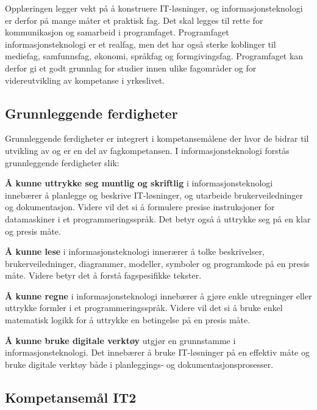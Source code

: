 \documentclass[%
oneside,                 %
final,                   %
10pt]{article}
\newenvironment{block_mdfboxadmon}[1][]{
\begin{block_mdfboxmdframed}[frametitle=#1]
}
{
\end{block_mdfboxmdframed}
}
\begin{document}
Opplæringen legger vekt på å konstruere IT-løsninger, og
informasjonsteknologi er derfor på mange måter et praktisk fag. Det
skal legges til rette for kommunikasjon og samarbeid i
programfaget. Programfaget informasjonsteknologi er et realfag, men
det har også sterke koblinger til mediefag, samfunnsfag, økonomi,
språkfag og formgivingsfag. Programfaget kan derfor gi et godt
grunnlag for studier innen ulike fagområder og for videreutvikling av
kompetanse i yrkeslivet.

\subsection{Grunnleggende ferdigheter}

Grunnleggende ferdigheter er integrert i kompetansemålene der hvor de
bidrar til utvikling av og er en del av fagkompetansen. I
informasjonsteknologi forstås grunnleggende ferdigheter slik:


\begin{block_mdfboxadmon}[]

\textbf{Å kunne uttrykke seg muntlig og skriftlig} i informasjonsteknologi
innebærer å planlegge og beskrive IT-løsninger, og utarbeide
brukerveiledninger og dokumentasjon. Videre vil det si å formulere
presise instruksjoner for datamaskiner i et programmeringsspråk. Det
betyr også å uttrykke seg på en klar og presis måte.

\textbf{Å kunne lese} i informasjonsteknologi innerærer å tolke beskrivelser,
brukerveiledninger, diagrammer, modeller, symboler og programkode på
en presis måte. Videre betyr det å forstå fagspesifikke tekster.

\textbf{Å kunne regne} i informasjonsteknologi innebærer å gjøre enkle
utregninger eller uttrykke formler i et programmeringsspråk. Videre
vil det si å bruke enkel matematisk logikk for å uttrykke en
betingelse på en presis måte.

\textbf{Å kunne bruke digitale verktøy} utgjør en grunnstamme i
informasjonsteknologi. Det innebærer å bruke IT-løsninger på en
effektiv måte og bruke digitale verktøy både i planleggings- og
dokumentasjonsprosesser.
\end{block_mdfboxadmon}



\subsection{Kompetansemål IT2}
\label{section:kompetansemål}
\end{document}
